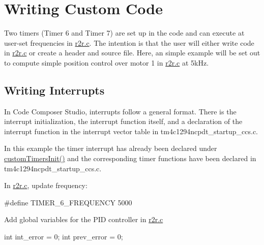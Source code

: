 \hypertarget{index_writingcustomcode}{}\section{Writing Custom Code}\label{index_writingcustomcode}
Two timers (Timer 6 and Timer 7) are set up in the code and can execute at user-\/set frequencies in {\ttfamily \mbox{\hyperlink{r2r_8c}{r2r.\+c}}}. The intention is that the user will either write code in \mbox{\hyperlink{r2r_8c}{r2r.\+c}} or create a header and source file. Here, an simple example will be set out to compute simple position control over motor 1 in \mbox{\hyperlink{r2r_8c}{r2r.\+c}} at 5k\+Hz.\hypertarget{index_writinginterrupts}{}\subsection{Writing Interrupts}\label{index_writinginterrupts}
In Code Composer Studio, interrupts follow a general format. There is the interrupt initialization, the interrupt function itself, and a declaration of the interrupt function in the interrupt vector table in {\ttfamily tm4c1294ncpdt\+\_\+startup\+\_\+ccs.\+c}.

In this example the timer interrupt has already been declared under {\ttfamily \mbox{\hyperlink{r2r_8h_a77af04bd0735a3d7eb04200c61fc7812}{custom\+Timers\+Init()}}} and the corresponding timer functions have been declared in {\ttfamily tm4c1294ncpdt\+\_\+startup\+\_\+ccs.\+c}.

In {\ttfamily \mbox{\hyperlink{r2r_8c}{r2r.\+c}}}, update frequency\+: \begin{DoxyVerb}    #define TIMER_6_FREQUENCY 5000
\end{DoxyVerb}


Add global variables for the P\+ID controller in {\ttfamily \mbox{\hyperlink{r2r_8c}{r2r.\+c}}} \begin{DoxyVerb}int int_error = 0;
int prev_error = 0;
\end{DoxyVerb}


